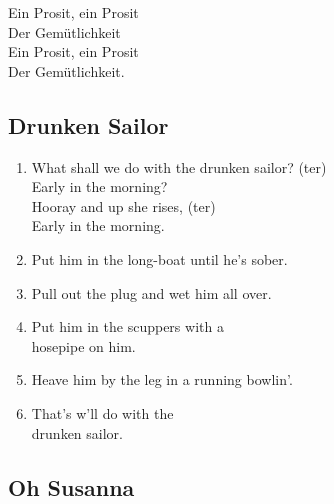 \documentclass[a5paper]{article}
\begin{document}
Ein Prosit, ein Prosit \\
Der Gem\"{u}tlichkeit \\
Ein Prosit, ein Prosit \\
Der Gem\"{u}tlichkeit.\\

\newpage

\subsection{Drunken Sailor} %
\label{sub:drunken_sailor}


\begin{enumerate}
	\item What shall we do with the drunken sailor? (ter)\\
	Early in the morning?\\
	Hooray and up she rises, (ter)\\
	Early in the morning.\\
	\item Put him in the long-boat until he's sober.\\
	\item Pull out the plug and wet him all over.\\
	\item Put him in the scuppers with a \\ hosepipe on him.\\
	\item Heave him by the leg in a running bowlin'.\\
	\item That's w'll do with the \\ drunken sailor.\\
\end{enumerate}



\newpage

\subsection{Oh Susanna} %
\label{sub:oh_susanna}
\end{document}
